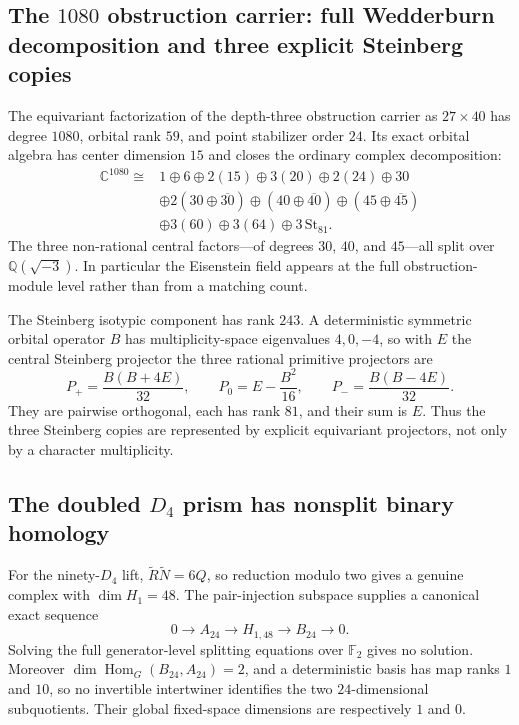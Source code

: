\subsection{The $1080$ obstruction carrier: full Wedderburn decomposition and three explicit Steinberg copies}
\label{sec:20260901-obstruction-wedderburn}

The equivariant factorization of the depth-three obstruction carrier as
$27\times40$ has degree $1080$, orbital rank $59$, and point stabilizer order
$24$.  Its exact orbital algebra has center dimension $15$ and closes the
ordinary complex decomposition:
\[
\begin{split}
\mathbb C^{1080}\cong{}&1\oplus6\oplus2(15)\oplus3(20)\oplus2(24)\oplus30\\
&\oplus2(30\oplus\overline{30})\oplus(40\oplus\overline{40})
\oplus(45\oplus\overline{45})\\
&\oplus3(60)\oplus3(64)\oplus3\,\mathrm{St}_{81}.
\end{split}
\]
The three non-rational central factors---of degrees $30$, $40$, and $45$---all
split over $\mathbb Q(\sqrt{-3})$.  In particular the Eisenstein field appears
at the full obstruction-module level rather than from a matching count.

The Steinberg isotypic component has rank $243$.  A deterministic symmetric
orbital operator $B$ has multiplicity-space eigenvalues $4,0,-4$, so with $E$
the central Steinberg projector the three rational primitive projectors are
\[
 P_+=\frac{B(B+4E)}{32},\qquad
 P_0=E-\frac{B^2}{16},\qquad
 P_-=\frac{B(B-4E)}{32}.
\]
They are pairwise orthogonal, each has rank $81$, and their sum is $E$.
Thus the three Steinberg copies are represented by explicit equivariant
projectors, not only by a character multiplicity.

\subsection{The doubled $D_4$ prism has nonsplit binary homology}
\label{sec:20260901-binary-d4-h1}

For the ninety-$D_4$ lift, $\widetilde R\widetilde N=6Q$, so reduction modulo
two gives a genuine complex with $\dim H_1=48$.  The pair-injection subspace
supplies a canonical exact sequence
\[
 \boxed{0\longrightarrow A_{24}\longrightarrow H_{1,48}
 \longrightarrow B_{24}\longrightarrow0}.
\]
Solving the full generator-level splitting equations over $\mathbb F_2$ gives
no solution.  Moreover $\dim\operatorname{Hom}_G(B_{24},A_{24})=2$, and a
deterministic basis has map ranks $1$ and $10$, so no invertible intertwiner
identifies the two $24$-dimensional subquotients.  Their global fixed-space
dimensions are respectively $1$ and $0$.


